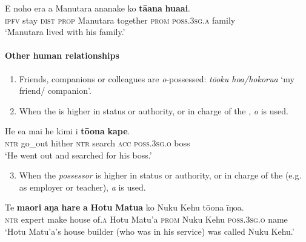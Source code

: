 \ea\label{ex:6.63}
\gll E noho era a Manutara ananake ko \textbf{tā{\ꞌ}ana} \textbf{hua{\ꞌ}ai}. \\
\textsc{ipfv} stay \textsc{dist} \textsc{prop} Manutara together \textsc{prom} \textsc{poss.3sg.a} family \\

\glt 
‘Manutara lived with his family.’ \textstyleExampleref{[R309.039]} 
\z
{}

\paragraph[Other human relationships]{Other human relationships}\label{sec:6.3.3.1.2}
\begin{enumerate}
\item 
Friends, companions or colleagues are \textit{o}{}-possessed: \textit{tō{\ꞌ}oku hoa/hokorua} ‘my friend/ companion’.

\item 
When the  is higher in status or authority, or in charge of the , \textit{o} is used.

\end{enumerate}

\ea\label{ex:6.64}
\gll He e{\ꞌ}a mai he kimi i \textbf{tō{\ꞌ}ona} \textbf{kape}. \\
\textsc{ntr} go\_out hither \textsc{ntr} search \textsc{acc} \textsc{poss.3sg.o} boss \\

\glt
‘He went out and searched for his boss.’ \textstyleExampleref{[R237.008]} 
\z

\begin{enumerate}
\setcounter{enumi}{2}
\item 
When the \textit{possessor} is higher in status or authority, or in charge of the  (e.g. as employer or teacher), \textit{{\ꞌ}a} is used.

\end{enumerate}

\ea\label{ex:6.65}
\gll Te \textbf{ma{\ꞌ}ori} \textbf{aŋa} \textbf{hare} \textbf{{\ꞌ}a} \textbf{Hotu} \textbf{Matu{\ꞌ}a} ko Nuku Kehu tō{\ꞌ}ona {\ꞌ}īŋoa. \\
\textsc{ntr} expert make house of\textsc{.a} Hotu Matu’a \textsc{prom} Nuku Kehu \textsc{poss.3sg.o} name \\

\glt 
‘Hotu Matu’a’s house builder (who was in his service) was called Nuku Kehu.’ \textstyleExampleref{[Ley-2-12.002]}
\z

